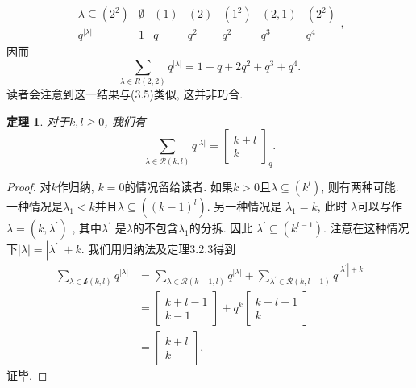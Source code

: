 \documentclass[a4paper,12pt]{ctexbook}
\newtheorem{theorem}[lemma]{\hspace{2em}定理}%
\begin{document}
$$
\begin{array}{c||c|c|c|c|c|c}
\lambda \subseteq\left(2^{2}\right) & \emptyset & (1) & (2) & \left(1^{2}\right) & (2,1) & \left(2^{2}\right) \\
\hline q^{|\lambda|} & 1 & q & q^{2} & q^{2} & q^{3} & q^{4}
\end{array},
$$
因而
$$
\sum_{\lambda \in R(2,2)} q^{|\lambda|}=1+q+2 q^{2}+q^{3}+q^{4}.
$$
读者会注意到这一结果与(3.5)类似, 这并非巧合.
\begin{theorem}
	对于$k, l \geq 0$, 我们有
	$$
	\sum_{\lambda \in \mathcal{R}(k, l)} q^{|\lambda|}=\left[\begin{array}{c}
	k+l \\
	k
	\end{array}\right]_{q} .
	$$
\end{theorem}
\begin{proof}
	对$k$作归纳,  $k=0$的情况留给读者. 如果$k>0$且$\lambda \subseteq\left(k^{l}\right)$, 则有两种可能. 一种情况是$\lambda_{1}<k$并且$\lambda \subseteq\left((k-1)^{l}\right)$. 另一种情况是 $\lambda_{1}=k$, 此时 $\lambda$可以写作$\lambda=\left(k, \lambda^{\prime}\right)$ , 其中$ \lambda^{\prime}$ 是$\lambda$的不包含$\lambda_{1}$的分拆. 因此 $\lambda^{\prime} \subseteq\left(k^{l-1}\right)$. 注意在这种情况下$|\lambda|=\left|\lambda^{\prime}\right|+k$. 我们用归纳法及定理3.2.3得到
	\[
	\begin{aligned}
	\sum_{\lambda \in \mathcal{k}(k, l)} q^{|\lambda|} &=\sum_{\lambda \in \mathcal{R}(k-1, l)} q^{|\lambda|}+\sum_{\lambda^{\prime} \in \mathcal{R}(k, l-1)} q^{\left|\lambda^{\prime}\right|+k} \\
	&=\left[\begin{array}{c}
	k+l-1 \\
	k-1
	\end{array}\right]+q^{k}\left[\begin{array}{c}
	k+l-1 \\
	k
	\end{array}\right] \\
	&=\left[\begin{array}{c}
	k+l \\
	k
	\end{array}\right],
	\end{aligned}
	\]证毕.
\end{proof}
\end{document}

